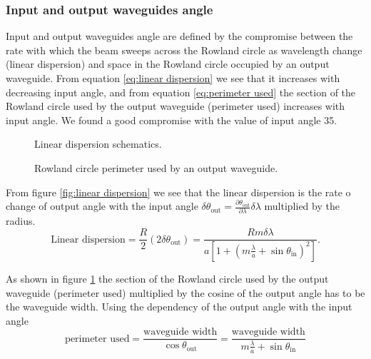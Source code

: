 \documentclass[12pt,twoside,english]{book}
\renewcommand{\~}{\perispomeni}%
\numberwithin{equation}{section}
\numberwithin{figure}{section}
\begin{document}
\subsubsection{Input and output waveguides angle}
Input and output waveguides angle are defined by the compromise between the rate with which the beam sweeps across the Rowland circle as wavelength change (linear dispersion\cite{Chowdhury:2000p56}) and space in the Rowland circle occupied by an output waveguide. From equation \ref{eq:linear dispersion} we see that it increases with decreasing input angle, and from equation \ref{eq:perimeter used} the section of the Rowland circle used by the output waveguide (perimeter used) increases with input angle. We found a good compromise with the value of input angle 35.
\begin{figure}[h]
	\begin{minipage}[t]{0.49\textwidth}
	
	\caption{Linear dispersion schematics.\label{fig:linear dispersion}}
\end{minipage}
\hfill
\begin{minipage}[t]{0.49\textwidth}
	
	\caption{Rowland circle perimeter used by an output waveguide.\label{fig:perimeter used}}
	\end{minipage}
\end{figure}

From figure \ref{fig:linear dispersion} we see that the linear dispersion is the rate o change of output angle with the input angle $\delta\theta_{\text{out}}=\frac{\partial\theta_{\text{out}}}{\partial\lambda}\delta\lambda$ multiplied by the radius.
\begin{equation}
\text{Linear dispersion}=\frac{R}{2}\left(2\delta\theta_{\text{out}}\right)=\frac{Rm\delta\lambda}{a\left[1+\left(m\frac{\lambda}{a}+\sin\theta_{\text{in}}\right)^{2}\right]}.
\label{eq:linear dispersion}
\end{equation}

As shown in figure \ref{fig:perimeter used} the section of the Rowland circle used by the output waveguide (perimeter used) multiplied by the cosine of the output angle has to be the waveguide width. Using the dependency of the output angle with the input angle
\begin{equation}
\text{perimeter used}
=\frac{\text{waveguide width}}{\cos\theta_{\text{out}}}
=\frac{\text{waveguide width}}{m\frac{\lambda}{a}+\sin\theta_{\text{in}}}
\label{eq:perimeter used}
\end{equation}
\end{document}
